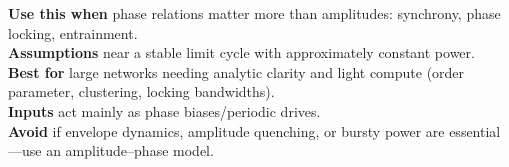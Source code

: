 \documentclass[12pt]{article}
\numberwithin{equation}{section}
\begin{document}
\begin{tcolorbox}[
  colback=gray!5,
  colframe=slate,
  colbacktitle=softblue!25,
  coltitle=softblue!60!black,
  fonttitle=\bfseries\small,
  title={\small When to Use It},
  boxrule=0.4pt,
  enhanced, sharp corners,
  left=4pt,right=4pt,top=3pt,bottom=3pt,
  boxsep=2pt,
  before skip=6pt, after skip=6pt
]
\scriptsize
\textbf{Use this when} phase relations matter more than amplitudes: synchrony, phase locking, entrainment.\\
\textbf{Assumptions} near a stable limit cycle with approximately constant power.\\
\textbf{Best for} large networks needing analytic clarity and light compute (order parameter, clustering, locking bandwidths).\\
\textbf{Inputs} act mainly as phase biases/periodic drives.\\
\textbf{Avoid} if envelope dynamics, amplitude quenching, or bursty power are essential—use an amplitude–phase model.
\end{tcolorbox}
\end{document}
